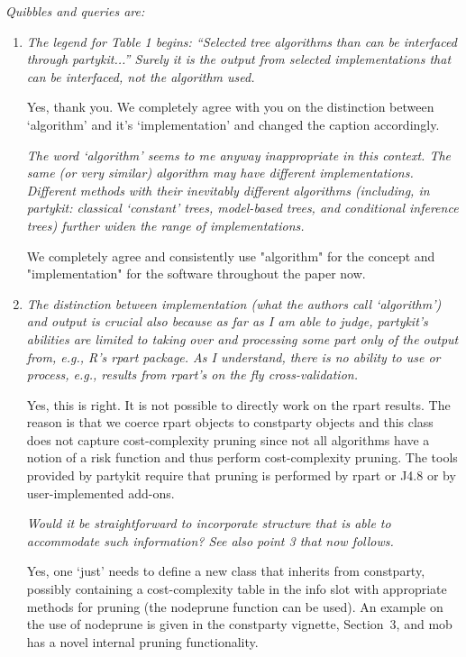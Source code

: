 \documentclass{article}
\begin{document}
\textit{Quibbles and queries are:}
\begin{enumerate}
\item 
\textit{
The legend for Table 1 begins: ``Selected tree algorithms than can be
interfaced through partykit...''  Surely it is the output from selected
implementations that can be interfaced, not the algorithm used.}

Yes, thank you. We completely agree with you on the distinction between
`algorithm' and it's `implementation' and changed the caption accordingly.

\textit{The word
`algorithm' seems to me anyway inappropriate in this context.  The same (or
very similar) algorithm may have different implementations.  Different
methods with their inevitably different algorithms (including, in partykit:
classical `constant' trees, model-based trees, and conditional inference
trees) further widen the range of implementations.}

We completely agree and consistently use "algorithm" for the concept
and "implementation" for the software throughout the paper now.

\item 
\textit{
The distinction between implementation (what the authors call `algorithm')
and output is crucial also because as far as I am able to judge, partykit's
abilities are limited to taking over and processing some part only of the
output from, e.g., R's rpart package.  As I understand, there is no ability
to use or process, e.g., results from rpart's on the fly cross-validation.}

Yes, this is right. It is not possible to directly work on the rpart
results.  The reason is that we coerce rpart objects to constparty objects
and this class does not capture cost-complexity pruning since not all
algorithms have a notion of a risk function and thus perform cost-complexity
pruning.  The tools provided by partykit require that pruning is performed
by rpart or J4.8 or by user-implemented add-ons.

\textit{Would it be straightforward to incorporate structure that is able to
accommodate such information?  See also point 3 that now follows.}

Yes, one `just' needs to define a new class that inherits from constparty,
possibly containing a cost-complexity table in the info slot with
appropriate methods for pruning (the nodeprune function can be used).  An
example on the use of nodeprune is given in the constparty vignette,
Section~3, and mob has a novel internal pruning functionality.


\end{enumerate}
\end{document}
